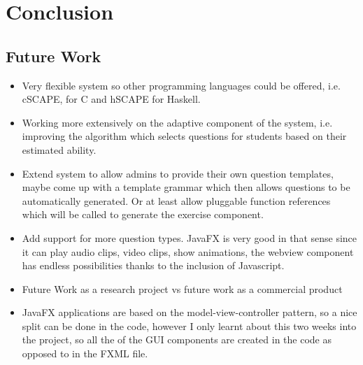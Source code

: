 \documentclass[11pt,a4paper]{report}
\begin{document}
\chapter{Conclusion}
\section{Future Work}
\begin{itemize}
\item Very flexible system so other programming languages could be offered, i.e. cSCAPE, for C and hSCAPE for Haskell. 
\item Working more extensively on the adaptive component of the system, i.e. improving the algorithm which selects questions for students based on their estimated ability.
\item Extend system to allow admins to provide their own question templates, maybe come up with a template grammar which then allows questions to be automatically generated. Or at least allow pluggable function references which will be called to generate the exercise component.
\item Add support for more question types. JavaFX is very good in that sense since it can play audio clips, video clips, show animations, the webview component has endless possibilities thanks to the inclusion of Javascript.
\item Future Work as a research project vs future work as a commercial product
\item JavaFX applications are based on the model-view-controller pattern, so a nice split can be done in the code, however I only learnt about this two weeks into the project, so all the of the GUI components are created in the code as opposed to in the FXML file.
\end{itemize}




\end{document}
